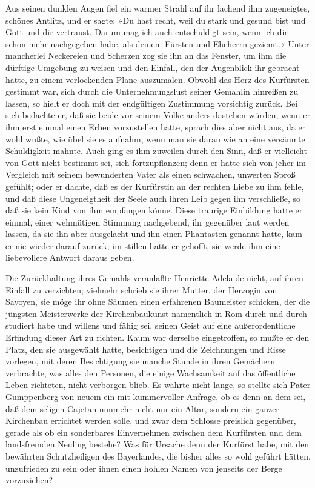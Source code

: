 Aus seinen dunklen Augen fiel ein warmer Strahl auf ihr lachend ihm
zugeneigtes, schönes Antlitz, und er sagte: »Du hast recht, weil du
stark und gesund bist und Gott und dir vertraust. Darum mag ich
auch entschuldigt sein, wenn ich dir schon mehr nachgegeben habe,
als deinem Fürsten und Eheherrn geziemt.« Unter mancherlei
Neckereien und Scherzen zog sie ihn an das Fenster, um ihm die
dürftige Umgebung zu weisen und den Einfall, den der Augenblick ihr
gebracht hatte, zu einem verlockenden Plane auszumalen. Obwohl das
Herz des Kurfürsten gestimmt war, sich durch die Unternehmungslust
seiner Gemahlin hinreißen zu lassen, so hielt er doch mit der
endgültigen Zustimmung vorsichtig zurück. Bei sich bedachte er, daß
sie beide vor seinem Volke anders dastehen würden, wenn er ihm erst
einmal einen\pagenum{[103]} Erben vorzustellen hätte, sprach dies
aber nicht aus, da er wohl wußte, wie übel sie es aufnahm, wenn man
sie daran wie an eine versäumte Schuldigkeit mahnte. Auch ging es
ihm zuweilen durch den Sinn, daß er vielleicht von Gott nicht
bestimmt sei, sich fortzupflanzen; denn er hatte sich von jeher im
Vergleich mit seinem bewunderten Vater als einen schwachen,
unwerten Sproß gefühlt; oder er dachte, daß es der Kurfürstin an
der rechten Liebe zu ihm fehle, und daß diese Ungeneigtheit der
Seele auch ihren Leib gegen ihn verschließe, so daß sie kein Kind
von ihm empfangen könne. Diese traurige Einbildung hatte er einmal,
einer wehmütigen Stimmung nachgebend, ihr gegenüber laut werden
lassen, da sie ihn aber ausgelacht und ihn einen Phantasten genannt
hatte, kam er nie wieder darauf zurück; im stillen hatte er
gehofft, sie werde ihm eine liebevollere Antwort daraus geben.

Die Zurückhaltung ihres Gemahls veranlaßte Henriette Adelaide
nicht, auf ihren Einfall zu verzichten; vielmehr schrieb sie ihrer
Mutter, der Herzogin von Savoyen, sie möge ihr ohne Säumen einen
erfahrenen Baumeister schicken, der die jüngsten Meisterwerke der
Kirchenbaukunst namentlich in Rom durch und durch studiert habe und
willens und fähig sei, seinen Geist auf eine außerordentliche
Erfindung dieser Art zu richten. Kaum war derselbe eingetroffen, so
mußte er den Platz, den sie ausgewählt hatte, besichtigen und die
Zeichnungen und Risse vorlegen, mit deren Besichtigung sie manche
Stunde in ihren Gemächern verbrachte, was alles den Personen, die
einige Wachsamkeit auf das öffentliche Leben richteten, nicht
verborgen blieb. Es währte nicht lange, so stellte sich Pater
Gumppenberg von neuem ein mit kummervoller Anfrage, ob es denn
\pagenum{[104]}an dem sei, daß dem seligen Cajetan nunmehr nicht
nur ein Altar, sondern ein ganzer Kirchenbau errichtet werden
solle, und zwar dem Schlosse preislich gegenüber, gerade als ob ein
sonderbares Einvernehmen zwischen dem Kurfürsten und dem
landsfremden Neuling bestehe? Was für Ursache denn der Kurfürst
habe, mit den bewährten Schutzheiligen des Bayerlandes, die bisher
alles so wohl geführt hätten, unzufrieden zu sein oder ihnen einen
hohlen Namen von jenseits der Berge vorzuziehen?

